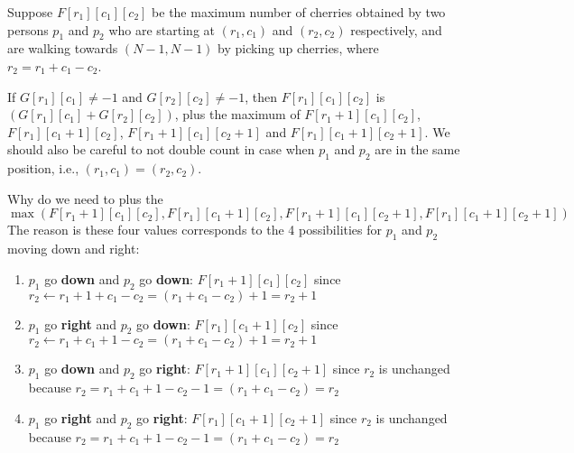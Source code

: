 Suppose $F[r_1][c_1][c_2]$ be the maximum number of cherries obtained by two persons $p_1$ and $p_2$ who are starting at $(r_1, c_1)$ and $(r_2, c_2)$ respectively, and are walking towards $(N-1, N-1)$ by picking up cherries, where $r_2 = r_1+c_1-c_2$.
\par
If $G[r_1][c_1] \neq -1$ and $G[r_2][c_2] \neq -1$, then $F[r_1][c_1][c_2]$ is $(G[r_1][c_1] + G[r_2][c_2])$, plus the maximum of $F[r_1+1][c_1][c_2]$, $F[r_1][c_1+1][c_2]$, $F[r_1+1][c_1][c_2+1]$ and $F[r_1][c_1+1][c_2+1]$. We should also be careful to not double count in case when $p_1$ and $p_2$ are in the same position, i.e., $(r_1, c_1) = (r_2, c_2)$.
\par
Why do we need to plus the 
\[
\max(F[r_1+1][c_1][c_2], F[r_1][c_1+1][c_2], F[r_1+1][c_1][c_2+1], F[r_1][c_1+1][c_2+1])
\]
The reason is these four values corresponds to the 4 possibilities for $p_1$ and $p_2$ moving down and right:
\begin{enumerate}
\item $p_1$ go \textbf{down} and $p_2$ go \textbf{down}: $F[r_1+1][c_1][c_2]$ since $r_2 \gets r_1 + 1 +c_1 -c_2 = (r_1+c_1-c_2) + 1 = r_2+1$
\item $p_1$ go \textbf{right} and $p_2$ go \textbf{down}: $F[r_1][c_1+1][c_2]$ since $r_2 \gets r_1 + c_1 + 1 -c_2 = (r_1+c_1-c_2) + 1 = r_2+1$
\item $p_1$ go \textbf{down} and $p_2$ go \textbf{right}: $F[r_1+1][c_1][c_2+1]$ since $r_2$ is unchanged because $r_2= r_1 + c_1 + 1 -c_2 - 1 = (r_1+c_1-c_2) = r_2$
\item $p_1$ go \textbf{right} and $p_2$ go \textbf{right}: $F[r_1][c_1+1][c_2+1]$ since $r_2$ is unchanged because $r_2= r_1 + c_1 + 1 -c_2 - 1 = (r_1+c_1-c_2) = r_2$
\end{enumerate}

